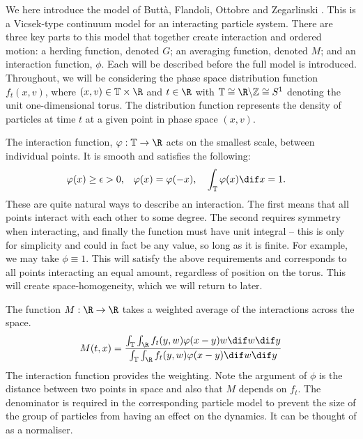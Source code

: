		We here introduce the model of Butt\`a, Flandoli, Ottobre and Zegarlinski \cite{Butta2019}. This is a Vicsek-type continuum model for an interacting particle system. There are three key parts to this model that together create interaction and ordered motion: a herding function, denoted $G$; an averaging function, denoted $M$; and an interaction function, $\phi$. Each will be described before the full model is introduced. Throughout, we will be considering the phase space distribution function $f_t(x,v)$, where $(x,v) \in \T \times \R$ and $t \in \R$ with $\T \cong \R \backslash \Z \cong S^1$ denoting the unit one-dimensional torus. The distribution function represents the density of particles at time $t$ at a given point in phase space $(x,v)$.
		
		The interaction function, $\phi: \T \to \R $ acts on the smallest scale, between individual points. It is smooth and satisfies the following:
		\begin{align}\label{eq:phi}
			\phi(x) \geq \epsilon >0, && \phi(x) = \phi(-x), &&& \int_{\T} \phi(x) \dif x = 1.
		\end{align}
		These are quite natural ways to describe an interaction. The first means that all points interact with each other to some degree. The second requires symmetry when interacting, and finally the function must have unit integral -- this is only for simplicity and could in fact be any value, so long as it is finite. For example, we may take $\phi \equiv 1$. This will satisfy the above requirements and corresponds to all points interacting an equal amount, regardless of position on the torus. This will create space-homogeneity, which we will return to later.
		
		The function $M:\R \to \R$ takes a weighted average of the interactions across the space.	
		\[ 
			M(t,x) = \frac{\int_{\T}\int_{\R}f_t(y,w)\phi(x-y)w\dif w \dif y}{\int_{\T}\int_{\R}f_t(y,w)\phi(x-y)\dif w \dif y}
		\]
		The interaction function provides the weighting. Note the argument of  $\phi$ is the distance between two points in space and also that $M$ depends on $f_t$. The denominator is required in the corresponding particle model to prevent the size of the group of particles from having an effect on the dynamics. It can be thought of as a normaliser.
		
